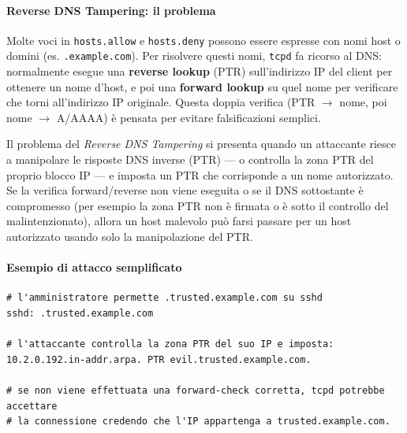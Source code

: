 \paragraph{Reverse DNS Tampering: il problema}
Molte voci in \texttt{hosts.allow} e \texttt{hosts.deny} possono essere espresse con nomi host o domini (es. \texttt{.example.com}).
Per risolvere questi nomi, \texttt{tcpd} fa ricorso al DNS: normalmente esegue una \textbf{reverse lookup} (PTR) sull'indirizzo IP del client per ottenere un nome d'host, e poi una \textbf{forward lookup} su quel nome per verificare che torni all'indirizzo IP originale.
Questa doppia verifica (PTR \(\to\) nome, poi nome \(\to\) A/AAAA) è pensata per evitare falsificazioni semplici.

Il problema del \textit{Reverse DNS Tampering} si presenta quando un attaccante riesce a manipolare le risposte DNS inverse (PTR) — o controlla la zona PTR del proprio blocco IP — e imposta un PTR che corrisponde a un nome autorizzato.
Se la verifica forward/reverse non viene eseguita o se il DNS sottostante è compromesso (per esempio la zona PTR non è firmata o è sotto il controllo del malintenzionato), allora un host malevolo può farsi passare per un host autorizzato usando solo la manipolazione del PTR.

\paragraph{Esempio di attacco semplificato}
\begin{verbatim}
# l'amministratore permette .trusted.example.com su sshd
sshd: .trusted.example.com

# l'attaccante controlla la zona PTR del suo IP e imposta:
10.2.0.192.in-addr.arpa. PTR evil.trusted.example.com.

# se non viene effettuata una forward-check corretta, tcpd potrebbe accettare
# la connessione credendo che l'IP appartenga a trusted.example.com.
\end{verbatim}

